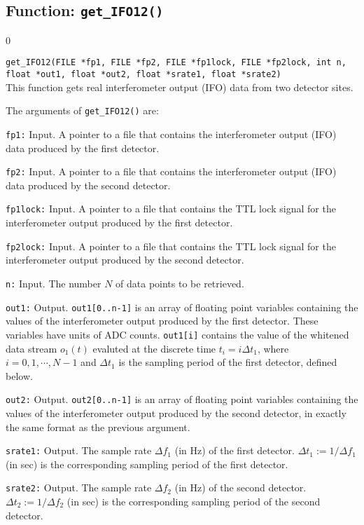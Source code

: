 \clearpage

\subsection{Function: {\tt get\_IFO12()}}
\label{subsec:get_IFO12}
\setcounter{equation}0

{\tt get\_IFO12(FILE *fp1, FILE *fp2, FILE *fp1lock, FILE *fp2lock, 
int n, float *out1, float *out2, float *srate1, float *srate2)}\\
%
This function gets real interferometer output (IFO) data from two 
detector sites.

The arguments of {\tt get\_IFO12()} are:
\begin{description}
%
\item{\tt fp1:} Input. 
A pointer to a file that contains the interferometer output (IFO) data 
produced by the first detector.
%
\item{\tt fp2:} Input. 
A pointer to a file that contains the interferometer output (IFO) data 
produced by the second detector.
%
\item{\tt fp1lock:} Input.
A pointer to a file that contains the TTL lock signal for the 
interferometer output produced by the first detector.
%
\item{\tt fp2lock:} Input.
A pointer to a file that contains the TTL lock signal for the 
interferometer output produced by the second detector.
%
\item{\tt n:} Input.
The number $N$ of data points to be retrieved.
%
\item{\tt out1:} Output.
{\tt out1[0..n-1]} is an array of floating point variables containing
the values of the interferometer output produced by the first detector.
These variables have units of ADC counts. 
{\tt out1[i]} contains the value of the whitened data stream $o_1(t)$
evaluted at the discrete time $t_i=i\Delta t_1$, where 
$i=0,1,\cdots,N-1$ and $\Delta t_1$ is the sampling period of the
first detector, defined below.
%
\item{\tt out2:} Output.
{\tt out2[0..n-1]} is an array of floating point variables containing
the values of the interferometer output produced by the second detector,
in exactly the same format as the previous argument.
%
\item{\tt srate1:} Output.
The sample rate $\Delta f_1$ (in Hz) of the first detector.
$\Delta t_1:=1/\Delta f_1$ (in sec) is the corresponding sampling 
period of the first detector.
%
\item{\tt srate2:} Output.
The sample rate $\Delta f_2$ (in Hz) of the second detector.
$\Delta t_2:=1/\Delta f_2$ (in sec) is the corresponding sampling 
period of the second detector.
\end{description}

